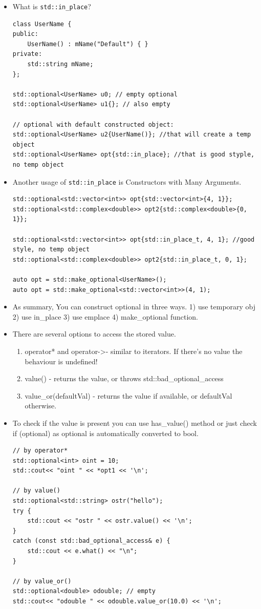 \documentclass[a4paper,11pt,twoside]{book}
\begin{document}
\begin{itemize}
\begin{lstlisting}
Name n{"Jim", std::nullopt, "Knopf"}; //learn how to use std::nullopt.
\end{lstlisting}

    \item What is \texttt{std::in\_place}? 
\begin{lstlisting}
class UserName {
public:
    UserName() : mName("Default") { }
private:
    std::string mName;
};

std::optional<UserName> u0; // empty optional
std::optional<UserName> u1{}; // also empty

// optional with default constructed object:
std::optional<UserName> u2{UserName()}; //that will create a temp object
std::optional<UserName> opt{std::in_place}; //that is good styple, no temp object
\end{lstlisting}
    \item Another usage of \texttt{std::in\_place} is Constructors with Many Arguments. 
\begin{lstlisting}
std::optional<std::vector<int>> opt{std::vector<int>{4, 1}};
std::optional<std::complex<double>> opt2{std::complex<double>{0, 1}};

std::optional<std::vector<int>> opt{std::in_place_t, 4, 1}; //good style, no temp object
std::optional<std::complex<double>> opt2{std::in_place_t, 0, 1};

auto opt = std::make_optional<UserName>();
auto opt = std::make_optional<std::vector<int>>(4, 1);
\end{lstlisting}
    \item As summary, You can construct optional in three ways. 1) use temporary obj 2) use in\_place 3) use emplace 4) make\_optional function.

    \item There are several options to access the stored value.
\begin{enumerate}
    \item operator* and operator->- similar to iterators. If there’s no value the behaviour is undefined!
    \item value() - returns the value, or throws std::bad\_optional\_access
        \item value\_or(defaultVal) - returns the value if available, or defaultVal otherwise.
\end{enumerate}
    \item To check if the value is present you can use has\_value() method or just check if (optional) as optional is automatically converted to bool.

\begin{lstlisting}
// by operator*
std::optional<int> oint = 10;
std::cout<< "oint " << *opt1 << '\n';

// by value()
std::optional<std::string> ostr("hello");
try {
    std::cout << "ostr " << ostr.value() << '\n';  
}
catch (const std::bad_optional_access& e) {
    std::cout << e.what() << "\n";
}

// by value_or()
std::optional<double> odouble; // empty
std::cout<< "odouble " << odouble.value_or(10.0) << '\n';
\end{lstlisting}
\end{itemize}
\end{document}
